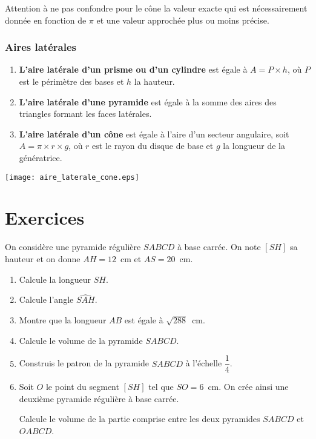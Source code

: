 \begin{Rq}
Attention à ne pas confondre pour le cône la valeur exacte qui est nécessairement donnée en fonction de $\pi$ et une valeur approchée plus ou moins précise.
\end{Rq}

\subsubsection{Aires latérales}

\begin{Df} 
\begin{enumerate}
\item \textbf{L'aire latérale d'un prisme ou d'un cylindre} est égale à $A=P \times h$, où $P$ est le périmètre des bases et $h$ la hauteur.
\item \textbf{L'aire latérale d'une pyramide} est égale à la somme des aires des triangles formant les faces latérales.
\item \textbf{L'aire latérale d'un cône} est égale à l'aire d'un secteur angulaire, soit $A=\pi \times r \times g$, où $r$ est le rayon du disque de base et $g$ la longueur de la génératrice.
\end{enumerate}
\end{Df}

\texttt{[image: aire\_laterale\_cone.eps]} 



\newpage



\section{Exercices}
\begin{Exo}
On considère une pyramide régulière $SABCD$ à
base carrée. On note $[SH]$ sa hauteur et on donne $AH=12$~cm et
$AS=20$~cm.
\begin{enumerate}
\item Calcule la longueur $SH$.
\item Calcule l'angle $\widehat{SAH}$.
\item Montre que la longueur $AB$ est égale à $\sqrt{288}$~cm.
\item Calcule le volume de la pyramide $SABCD$.
\item Construis le patron de la pyramide $SABCD$ à l'échelle
$\dfrac14$.
\item Soit $O$ le point du segment $[SH]$ tel que $SO=6$~cm. On crée
ainsi une deuxième pyramide régulière à base carrée.
\par Calcule le volume de la partie comprise entre les deux pyramides
$SABCD$ et $OABCD$.
\end{enumerate}
\end{Exo}

